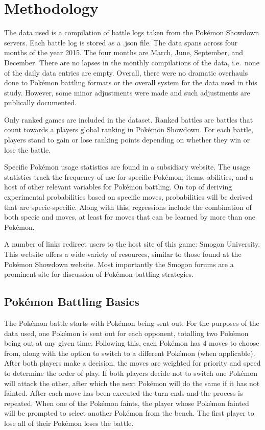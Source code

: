\documentclass[12pt,twoside]{reedthesis}
\begin{document}
  \chapter{Methodology}\label{methodology}
  
  The data used is a compilation of battle logs taken from the Pokémon
  Showdown servers. Each battle log is stored as a .json file. The data
  spans across four months of the year 2015. The four months are March,
  June, September, and December. There are no lapses in the monthly
  compilations of the data, i.e.~none of the daily data entries are empty.
  Overall, there were no dramatic overhauls done to Pokémon battling
  formats or the overall system for the data used in this study. However,
  some minor adjustments were made and such adjustments are publically
  documented.
  
  Only ranked games are included in the dataset. Ranked battles are
  battles that count towards a players global ranking in Pokémon Showdown.
  For each battle, players stand to gain or lose ranking points depending
  on whether they win or lose the battle.
  
  Specific Pokémon usage statistics are found in a subsidiary website. The
  usage statistics track the frequency of use for specific Pokémon, items,
  abilities, and a host of other relevant variables for Pokémon battling.
  On top of deriving experimental probabilities based on specific moves,
  probabilities will be derived that are specie-specific. Along with this,
  regressions include the combination of both specie and moves, at least
  for moves that can be learned by more than one Pokémon.
  
  A number of links redirect users to the host site of this game: Smogon
  University. This website offers a wide variety of resources, similar to
  those found at the Pokémon Showdown website. Most importantly the Smogon
  forums are a prominent site for discussion of Pokémon battling
  strategies.
  
  \section{Pokémon Battling Basics}\label{pokemon-battling-basics}
  
  The Pokémon battle starts with Pokémon being sent out. For the purposes
  of the data used, one Pokémon is sent out for each opponent, totalling
  two Pokémon being out at any given time. Following this, each Pokémon
  has 4 moves to choose from, along with the option to switch to a
  different Pokémon (when applicable). After both players make a decision,
  the moves are weighted for priority and speed to determine the order of
  play. If both players decide not to switch one Pokémon will attack the
  other, after which the next Pokémon will do the same if it has not
  fainted. After each move has been executed the turn ends and the process
  is repeated. When one of the Pokémon faints, the player whose Pokémon
  fainted will be prompted to select another Pokémon from the bench. The
  first player to lose all of their Pokémon loses the battle.
  
\end{document}
